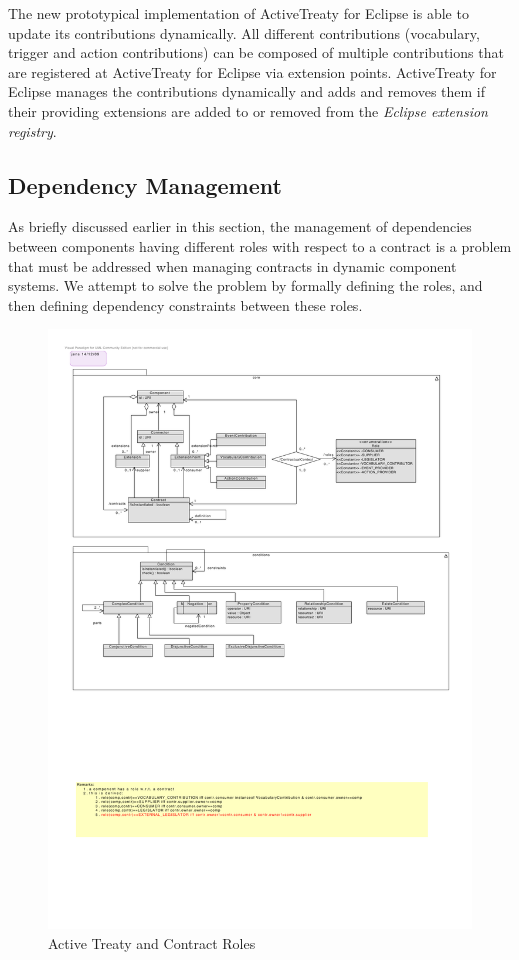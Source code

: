 \documentclass{llncs}
\begin{document}
The new prototypical implementation of ActiveTreaty for Eclipse is able to update its contributions dynamically. All different contributions (vocabulary, trigger and action contributions) can be composed of multiple contributions that are registered at ActiveTreaty for Eclipse via extension points. ActiveTreaty for Eclipse manages the contributions dynamically and adds and removes them if their providing extensions are added to or removed from the \textit{Eclipse extension registry}.



\subsection{Dependency Management}

As briefly discussed earlier in this section, the management of dependencies between components having different roles with respect to a contract is a problem that must be addressed when managing contracts in dynamic component systems. We attempt to solve the problem by formally defining the roles, and then defining dependency constraints between these roles. 

\begin{figure}[t]
  \centering
  \includegraphics[width=1.0\textwidth]{RoleModel2.pdf}
  \caption{Active Treaty and Contract Roles}
  \label{fig2}
\end{figure}
\end{document}
